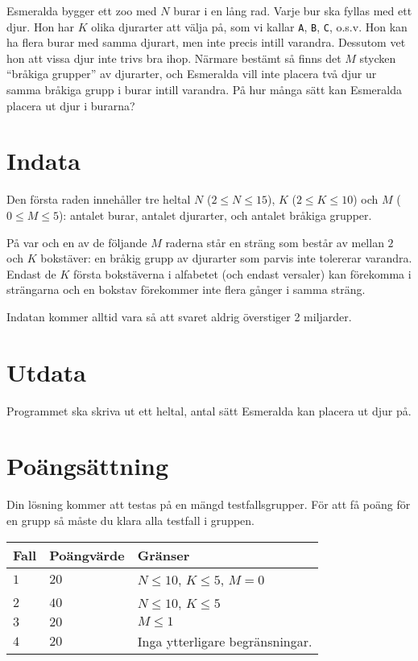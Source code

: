Esmeralda bygger ett zoo med $N$ burar i en lång rad.
Varje bur ska fyllas med ett djur. Hon har $K$ olika djurarter att välja på, som vi kallar \texttt{A}, \texttt{B}, \texttt{C}, o.s.v. Hon kan ha flera burar med samma djurart, men inte precis intill varandra. Dessutom vet hon att vissa djur inte trivs bra ihop. Närmare bestämt så finns det $M$ stycken ``bråkiga grupper'' av djurarter, och Esmeralda vill inte placera två djur ur samma bråkiga grupp i burar intill varandra. På hur många sätt kan Esmeralda placera ut djur i burarna?

\section*{Indata}
Den första raden innehåller tre heltal $N$ ($2 \le N \le 15$), $K$ ($2 \le K \le 10$) och $M$ ($0 \le M \le 5$): antalet burar, antalet djurarter, och antalet bråkiga grupper.

På var och en av de följande $M$ raderna står en sträng som består av mellan $2$ och $K$ bokstäver: en bråkig grupp av djurarter som parvis inte tolererar varandra.
Endast de $K$ första bokstäverna i alfabetet (och endast versaler) kan förekomma i strängarna och en bokstav förekommer inte flera gånger i samma sträng.

Indatan kommer alltid vara så att svaret aldrig överstiger 2 miljarder.

\section*{Utdata}
Programmet ska skriva ut ett heltal, antal sätt Esmeralda kan placera ut djur på.

\section*{Poängsättning}
Din lösning kommer att testas på en mängd testfallsgrupper.
För att få poäng för en grupp så måste du klara alla testfall i gruppen.

\noindent
\begin{tabular}{| l | l | l |}
  \hline
  Fall & Poängvärde & Gränser \\ \hline
  $1$    & $20$        &  $N \le 10$, $K \le 5$, $M=0$\\ \hline 
  $2$    & $40$        &  $N \le 10$, $K \le 5$ \\ \hline
  $3$    & $20$        &  $M \le 1$ \\ \hline
  $4$    & $20$        &  Inga ytterligare begränsningar. \\ \hline
\end{tabular}

